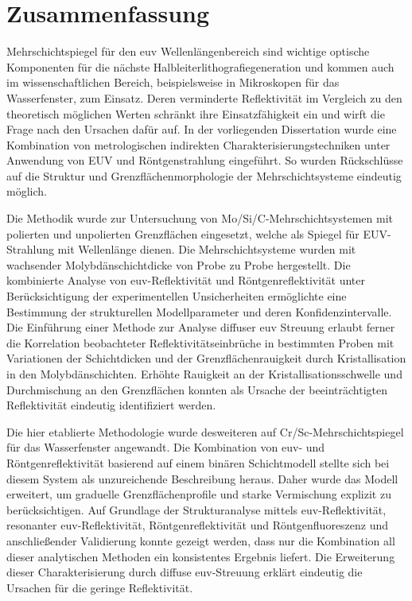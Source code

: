 \cleardoublepage

\thispagestyle{empty}

\section*{Zusammenfassung}

    Mehrschichtspiegel für den \gls{euv} Wellenlängenbereich sind wichtige optische Komponenten für die nächste Halbleiterlithografiegeneration und kommen auch im wissenschaftlichen Bereich, beispielsweise in Mikroskopen für das Wasserfenster, zum Einsatz. Deren verminderte Reflektivität im Vergleich zu den theoretisch möglichen Werten schränkt ihre Einsatzfähigkeit ein und wirft die Frage nach den Ursachen dafür auf. In der vorliegenden Dissertation wurde eine Kombination von metrologischen indirekten Charakterisierungstechniken unter Anwendung von EUV und Röntgenstrahlung eingeführt. So wurden Rückschlüsse auf die Struktur und Grenzflächenmorphologie der Mehrschichtsysteme eindeutig möglich.
    
    Die Methodik wurde zur Untersuchung von Mo/Si/C-Mehrschichtsystemen mit polierten und unpolierten Grenzflächen eingesetzt, welche als Spiegel für EUV-Strahlung mit  Wellenlänge dienen. Die Mehrschichtsysteme wurden mit wachsender Molybdänschichtdicke von Probe zu Probe hergestellt. Die kombinierte Analyse von \gls{euv}-Reflektivität und Röntgenreflektivität unter Berücksichtigung der experimentellen Unsicherheiten ermöglichte eine Bestimmung der strukturellen Modellparameter und deren Konfidenzintervalle. Die Einführung einer Methode zur Analyse diffuser \gls{euv} Streuung erlaubt ferner die Korrelation beobachteter Reflektivitätseinbrüche in bestimmten Proben mit Variationen der Schichtdicken und der Grenzflächenrauigkeit durch Kristallisation in den Molybdänschichten. Erhöhte Rauigkeit an der Kristallisationsschwelle und Durchmischung an den Grenzflächen konnten als Ursache der beeinträchtigten Reflektivität eindeutig identifiziert werden.

    Die hier etablierte Methodologie wurde desweiteren auf Cr/Sc-Mehrschichtspiegel für das Wasserfenster angewandt. Die Kombination von \gls{euv}- und Röntgenreflektivität basierend auf einem binären Schichtmodell stellte sich bei diesem System als unzureichende Beschreibung heraus. Daher wurde das Modell erweitert, um graduelle Grenzflächenprofile und starke Vermischung explizit zu berücksichtigen. Auf Grundlage der Strukturanalyse mittels \gls{euv}-Reflektivität, resonanter \gls{euv}-Reflektivität, Röntgenreflektivität und Röntgenfluoreszenz und anschließender Validierung konnte gezeigt werden, dass nur die Kombination all dieser analytischen Methoden ein konsistentes Ergebnis liefert. Die Erweiterung dieser Charakterisierung durch diffuse \gls{euv}-Streuung erklärt eindeutig die Ursachen für die geringe Reflektivität.

\cleardoublepage
